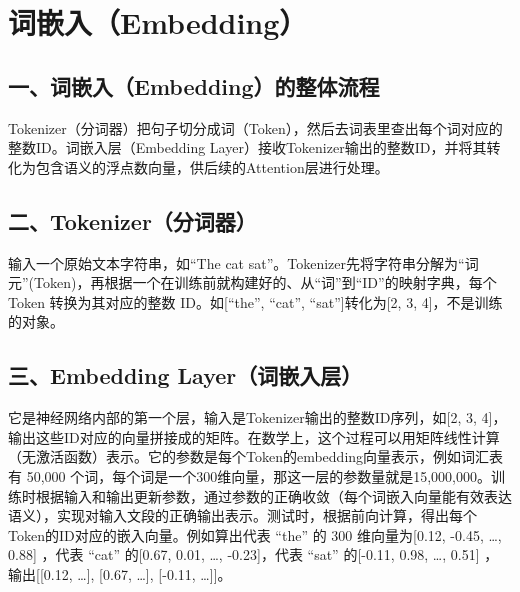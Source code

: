 \clearpage

\hypertarget{ux8bcdux5d4cux5165embedding}{%
\section{词嵌入（Embedding）}\label{ux8bcdux5d4cux5165embedding}}

\hypertarget{ux4e00ux8bcdux5d4cux5165embeddingux7684ux6574ux4f53ux6d41ux7a0b}{%
\subsection{一、词嵌入（Embedding）的整体流程}\label{ux4e00ux8bcdux5d4cux5165embeddingux7684ux6574ux4f53ux6d41ux7a0b}}

Tokenizer（分词器）把句子切分成词（Token），然后去词表里查出每个词对应的整数ID。词嵌入层（Embedding Layer）接收Tokenizer输出的整数ID，并将其转化为包含语义的浮点数向量，供后续的Attention层进行处理。

\hypertarget{ux4e8ctokenizerux5206ux8bcdux5668}{%
\subsection{二、Tokenizer（分词器）}\label{ux4e8ctokenizerux5206ux8bcdux5668}}

输入一个原始文本字符串，如``The cat sat''。Tokenizer先将字符串分解为``词元''(Token)，再根据一个在训练前就构建好的、从``词''到``ID''的映射字典，每个 Token 转换为其对应的整数 ID。如{[}``the'', ``cat'', ``sat''{]}转化为{[}2, 3, 4{]}，不是训练的对象。

\hypertarget{ux4e09embedding-layerux8bcdux5d4cux5165ux5c42}{%
\subsection{三、Embedding Layer（词嵌入层）}\label{ux4e09embedding-layerux8bcdux5d4cux5165ux5c42}}

它是神经网络内部的第一个层，输入是Tokenizer输出的整数ID序列，如{[}2, 3, 4{]}，输出这些ID对应的向量拼接成的矩阵。在数学上，这个过程可以用矩阵线性计算（无激活函数）表示。它的参数是每个Token的embedding向量表示，例如词汇表有 50,000 个词，每个词是一个300维向量，那这一层的参数量就是15,000,000。训练时根据输入和输出更新参数，通过参数的正确收敛（每个词嵌入向量能有效表达语义），实现对输入文段的正确输出表示。测试时，根据前向计算，得出每个Token的ID对应的嵌入向量。例如算出代表 ``the'' 的 300 维向量为{[}0.12, -0.45, \ldots, 0.88{]} ，代表 ``cat'' 的{[}0.67, 0.01, \ldots, -0.23{]}，代表 ``sat'' 的{[}-0.11, 0.98, \ldots, 0.51{]} ，输出{[}{[}0.12, \ldots{]}, {[}0.67, \ldots{]}, {[}-0.11, \ldots{]}{]}。

